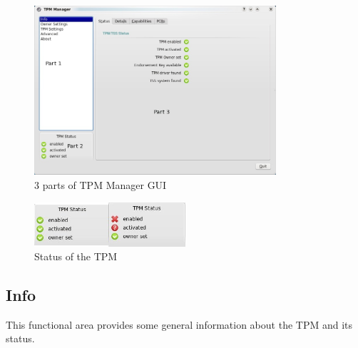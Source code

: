 \documentclass[
  american        %
]{sirrixreport}
\begin{document}
\begin{figure}[h]
 \centering
   \includegraphics[width=0.8\textwidth]{images/tpmmanager_parts.jpg}
   \caption{3 parts of TPM Manager GUI}
\label{fig:tpmmanager}
\end{figure}
\begin{figure}[h]
 \centering
   \includegraphics[width=0.5\textwidth]{images/stat.jpg}\caption{Status of the TPM}\label{fig:stat1}
\label{fig:stat2}
\end{figure}
\clearpage

\subsection{Info} This functional area provides some general information about the TPM and its status.
\end{document}
